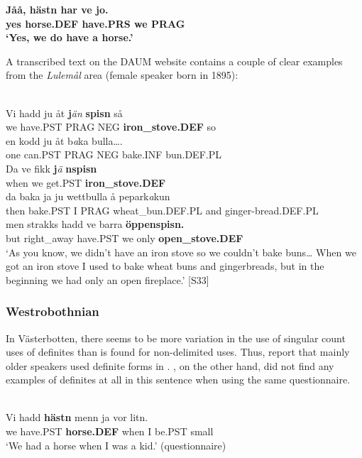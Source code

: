 \z

\ea\gll\bfseries
Jåå,  hästn  har  ve  jo.\\
\bfseries
yes  horse.DEF  have.PRS  we  PRAG\\
\glt ‘Yes, we do have a horse.’ 

\z

A transcribed text on the DAUM website contains a couple of clear examples from the \textit{Lulemål} area (female speaker born in 1895):

\ea \label{} 
\\
\gll Vi  hadd  ju  åt  \textbf{j}\textit{än} \textbf{spisn} så\\
we  have.PST  PRAG  NEG  \textbf{iron\_stove.DEF} so\\
\gll en  kodd  ju  åt  b\textit{a}ka  bulla….\\
one  can.PST  PRAG  NEG  bake.INF  bun.DEF.PL\\
\gll Da  ve  fikk  \textbf{j}\textit{ä} \textbf{nspisn}\\
when  we  get.PST  \textbf{iron\_stove.DEF}\\
\gll da  baka  ja  ju  wettbulla  å  pepark\textit{a}kun\\
then  bake.PST  I  PRAG  wheat\_bun.DEF.PL  and  ginger-bread.DEF.PL\\
\gll men  strakks  hadd  ve  barra  \textbf{öppenspisn.}\\
but  right\_away  have.PST  we  only  \textbf{open\_stove.DEF}\\
\glt ‘As you know, we didn’t have an iron stove so we couldn’t bake buns… When we got an iron stove I used to bake wheat buns and gingerbreads, but in the beginning we had only an open fireplace.’ [S33]

\z

\subsubsection{Westrobothnian}
 In Västerbotten, there seems to be more variation in the use of singular count uses of definites than is found for non-delimited uses. Thus, \citet{BergholmEtAl1999} report that mainly older speakers used definite forms in . \citet{WälchliEtAl1998}, on the other hand, did not find any examples of definites at all in this sentence when using the same questionnaire.

\ea \label{} 
\\
\gll Vi  hadd  \textbf{hästn} menn  ja  vor  litn.\\
we  have.PST  \textbf{horse.DEF} when  I   be.PST  small\\
\glt ‘We had a horse when I was a kid.’ (questionnaire)

